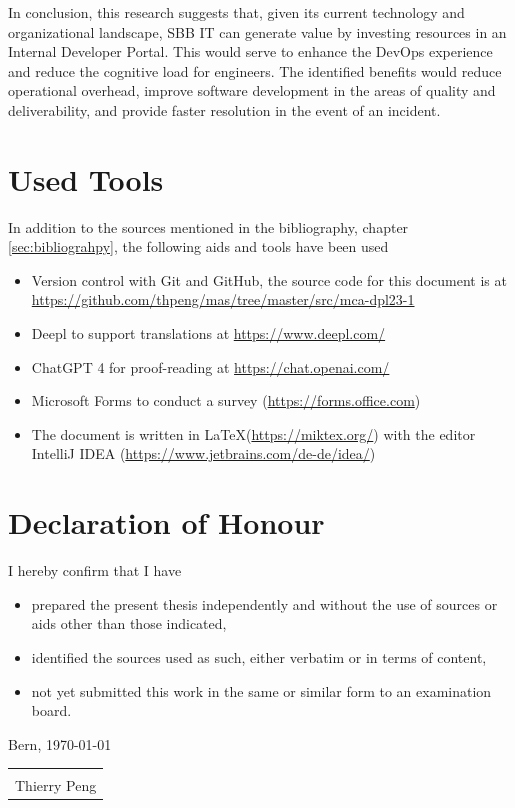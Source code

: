 \documentclass[a4paper,10pt]{article}
\begin{document}
    In conclusion, this research suggests that, given its current technology and organizational landscape, SBB IT can
    generate value by investing resources in an Internal Developer Portal.
    This would serve to enhance the DevOps experience and reduce the cognitive load for engineers.
    The identified benefits would reduce operational overhead, improve software development in the areas of quality and
    deliverability, and provide faster resolution in the event of an incident.

    \pagebreak


    \tableofcontents
    \pagebreak

    \section*{Used Tools}
    In addition to the sources mentioned in the bibliography, chapter \ref{sec:bibliograhpy}, the following aids and tools have been used
    \begin{itemize}
        \item Version control with Git and GitHub, the source code for this document is at \url{https://github.com/thpeng/mas/tree/master/src/mca-dpl23-1}
        \item Deepl to support translations at \url{https://www.deepl.com/}
        \item ChatGPT 4 for proof-reading at \url{https://chat.openai.com/}
        \item Microsoft Forms to conduct a survey (\url{https://forms.office.com})
        \item The document is written in \LaTeX  (\url{https://miktex.org/}) with the editor IntelliJ IDEA (\url{https://www.jetbrains.com/de-de/idea/})
    \end{itemize}

    \section*{Declaration of Honour}

    I hereby confirm that I have
    \begin{itemize}
        \item prepared the present thesis independently and without the use of sources or aids other than those indicated,
        \item identified the sources used as such, either verbatim or in terms of content,
        \item not yet submitted this work in the same or similar form to an examination board.
    \end{itemize}
    Bern, \today\newline
    \newline
    \newline
    \newline
    \begin{tabular}{@{}p{5.0cm}@{}}
        \hrulefill \\
        Thierry Peng
    \end{tabular}
\end{document}
